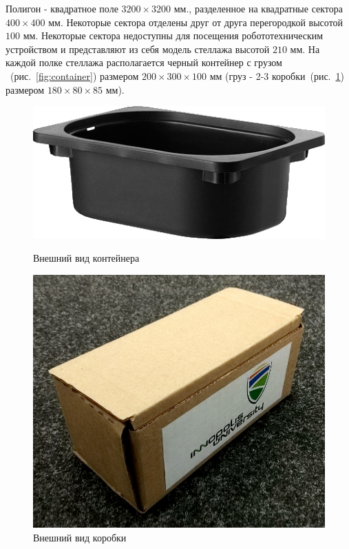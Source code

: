 Полигон - квадратное поле $3200\times3200$ мм., разделенное на квадратные сектора $400 \times 400$ мм.
Некоторые сектора отделены друг от друга перегородкой высотой $100$ мм.
Некоторые сектора недоступны для посещения робототехническим устройством и представляют из себя 
модель стеллажа высотой $210$ мм.
На каждой полке стеллажа располагается черный контейнер с грузом ~(рис.~\ref{fig:container}) размером
$200 \times 300 \times 100$ мм (груз - 2-3 коробки~(рис.~\ref{fig:box}) размером $180 \times 80 \times 85$ мм).


\begin{figure}[h]
\begin{center}
\begin{minipage}[h]{0.5\linewidth}
\includegraphics[width=1\linewidth]{sources/container}
\caption{Внешний вид контейнера}
\label{fig:container} 
\end{minipage}
\hfill 
\begin{minipage}[h]{0.4\linewidth}
\includegraphics[width=1\linewidth]{sources/box}
\caption{Внешний вид коробки}
\label{fig:box}
\end{minipage}
\end{center}
\end{figure}

